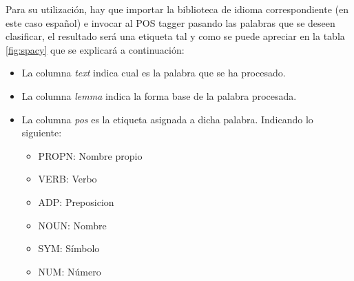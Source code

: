 
Para su utilización, hay que importar la biblioteca de idioma correspondiente (en este caso español) e invocar al POS tagger pasando las palabras que se deseen clasificar, el resultado será una etiqueta tal y como se puede apreciar en la tabla \ref{fig:spacy} que se explicará a continuación:
\begin{itemize}
	\item La columna \textit{text} indica cual es la palabra que se ha procesado.
	\item La columna \textit{lemma} indica la forma base de la palabra procesada.
	\item La columna \textit{pos} es la etiqueta asignada a dicha palabra. Indicando lo siguiente:
		\begin{itemize}
			\item PROPN: Nombre propio
			\item VERB: Verbo
			\item ADP: Preposicion
			\item NOUN: Nombre
			\item SYM: Símbolo
			\item NUM: Número
		\end{itemize}
\end{itemize}



